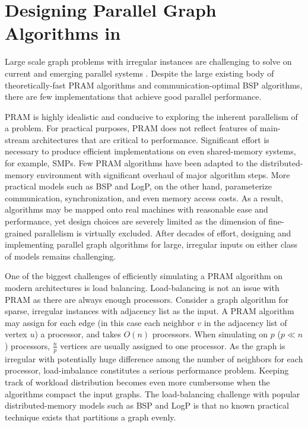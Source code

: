 
\section{Designing Parallel Graph Algorithms in \Xten{}}
\label{s:design}


 Large scale graph problems with irregular instances are challenging
 to solve on current and emerging parallel systems
 \cite{BC07}. Despite the large existing body of theoretically-fast
 PRAM algorithms and communication-optimal BSP algorithms, there are
 few implementations that achieve good parallel performance.


PRAM is highly idealistic and conducive to exploring the inherent
parallelism of a problem. For practical purposes, PRAM does not
reflect features of main-stream architectures that are critical to
performance. Significant effort is necessary to produce efficient
implementations on even shared-memory systems, for example, SMPs. Few
PRAM algorithms have been adapted to the distributed-memory
environment with significant overhaul of major algorithm steps. More
practical models such as BSP and LogP, on the other hand, parameterize
communication, synchronization, and even memory access costs. As a
result, algorithms may be mapped onto real machines with reasonable
ease and performance, yet design choices are severely limited as the
dimension of fine-grained parallelism is virtually excluded. After
decades of effort, designing and implementing parallel graph
algorithms for large, irregular inputs on either class of models
remains challenging.

 One of the biggest challenges of efficiently simulating a PRAM
 algorithm on modern architectures is load balancing. Load-balancing
 is not an issue with PRAM as there are always enough
 processors. Consider a graph algorithm for sparse, irregular
 instances with adjacency list as the input. A PRAM algorithm may
 assign for each edge (in this case each neighbor $v$ in the adjacency
 list of vertex $u$) a processor, and takes $O(n)$ processors. When
 simulating on $p$ ($p\ll n$) processors, $\frac{n}{p}$ vertices are
 usually assigned to one processor. As the graph is irregular with
 potentially huge difference among the number of neighbors for each
 processor, load-imbalance constitutes a serious performance
 problem. Keeping track of workload distribution becomes even more
 cumbersome when the algorithms compact the input graphs. The
 load-balancing challenge with popular distributed-memory models such
 as BSP and LogP is that no known practical technique exists that
 partitions a graph evenly.

